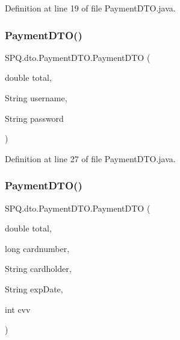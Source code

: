 Definition at line 19 of file Payment\+D\+T\+O.\+java.

\mbox{\label{class_s_p_q_1_1dto_1_1_payment_d_t_o_ab51beb9eef60e0b57b11bab85ce42454}} 
\subsubsection{\texorpdfstring{Payment\+D\+T\+O()}{PaymentDTO()}\hspace{0.1cm}{\footnotesize\ttfamily [2/6]}}
{\footnotesize\ttfamily S\+P\+Q.\+dto.\+Payment\+D\+T\+O.\+Payment\+D\+TO (\begin{DoxyParamCaption}\item[{double}]{total,  }\item[{String}]{username,  }\item[{String}]{password }\end{DoxyParamCaption})}



Definition at line 27 of file Payment\+D\+T\+O.\+java.

\mbox{\label{class_s_p_q_1_1dto_1_1_payment_d_t_o_a4a6f91d0976ce0af97a8f7f15658294c}} 
\subsubsection{\texorpdfstring{Payment\+D\+T\+O()}{PaymentDTO()}\hspace{0.1cm}{\footnotesize\ttfamily [3/6]}}
{\footnotesize\ttfamily S\+P\+Q.\+dto.\+Payment\+D\+T\+O.\+Payment\+D\+TO (\begin{DoxyParamCaption}\item[{double}]{total,  }\item[{long}]{cardnumber,  }\item[{String}]{cardholder,  }\item[{String}]{exp\+Date,  }\item[{int}]{cvv }\end{DoxyParamCaption})}



